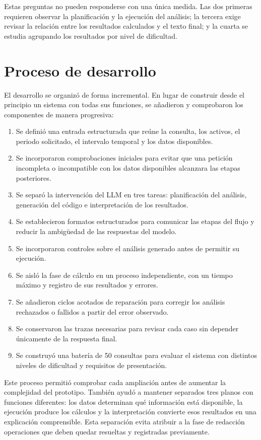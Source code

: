 Estas preguntas no pueden responderse con una única medida. Las dos primeras requieren observar la planificación y la ejecución del análisis; la tercera exige revisar la relación entre los resultados calculados y el texto final; y la cuarta se estudia agrupando los resultados por nivel de dificultad.

\section{Proceso de desarrollo}
\label{sec:evolucion_mvp}

El desarrollo se organizó de forma incremental. En lugar de construir desde el principio un sistema con todas sus funciones, se añadieron y comprobaron los componentes de manera progresiva:

\begin{enumerate}
    \item Se definió una entrada estructurada que reúne la consulta, los activos, el periodo solicitado, el intervalo temporal y los datos disponibles.
    \item Se incorporaron comprobaciones iniciales para evitar que una petición incompleta o incompatible con los datos disponibles alcanzara las etapas posteriores.
    \item Se separó la intervención del LLM en tres tareas: planificación del análisis, generación del código e interpretación de los resultados.
    \item Se establecieron formatos estructurados para comunicar las etapas del flujo y reducir la ambigüedad de las respuestas del modelo.
    \item Se incorporaron controles sobre el análisis generado antes de permitir su ejecución.
    \item Se aisló la fase de cálculo en un proceso independiente, con un tiempo máximo y registro de sus resultados y errores.
    \item Se añadieron ciclos acotados de reparación para corregir los análisis rechazados o fallidos a partir del error observado.
    \item Se conservaron las trazas necesarias para revisar cada caso sin depender únicamente de la respuesta final.
    \item Se construyó una batería de 50 consultas para evaluar el sistema con distintos niveles de dificultad y requisitos de presentación.
\end{enumerate}

Este proceso permitió comprobar cada ampliación antes de aumentar la complejidad del prototipo. También ayudó a mantener separados tres planos con funciones diferentes: los datos determinan qué información está disponible, la ejecución produce los cálculos y la interpretación convierte esos resultados en una explicación comprensible. Esta separación evita atribuir a la fase de redacción operaciones que deben quedar resueltas y registradas previamente.

